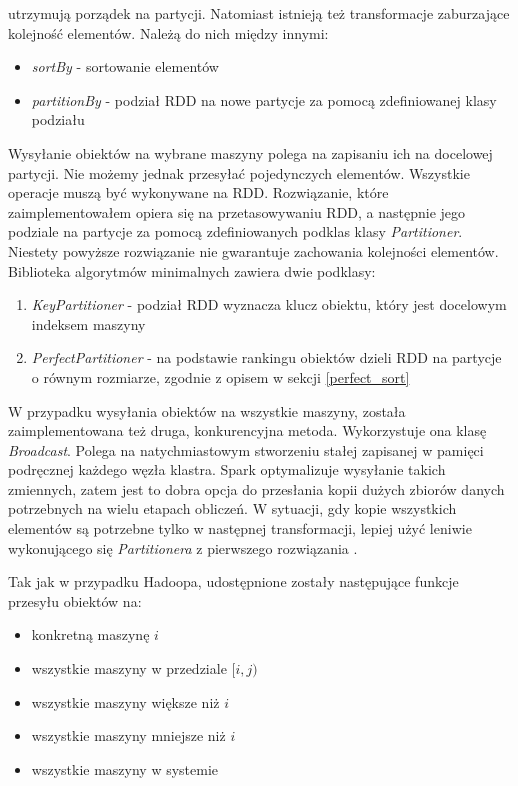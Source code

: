 \documentclass[licencjacka]{pracamgr}
\begin{document}
 utrzymują porządek na partycji. Natomiast istnieją też transformacje zaburzające kolejność elementów. Należą do nich między innymi:
 \begin{itemize}
     \item \textit{sortBy} - sortowanie elementów
     \item \textit{partitionBy} - podział RDD na nowe partycje za pomocą zdefiniowanej klasy podziału
 \end{itemize}

Wysyłanie obiektów na wybrane maszyny polega na zapisaniu ich na docelowej partycji. Nie możemy jednak przesyłać pojedynczych elementów. Wszystkie operacje muszą być wykonywane na RDD. Rozwiązanie, które zaimplementowałem opiera się na przetasowywaniu RDD, a następnie jego podziale na partycje za pomocą zdefiniowanych podklas klasy \textit{Partitioner}. Niestety powyższe rozwiązanie nie gwarantuje zachowania kolejności elementów. Biblioteka algorytmów minimalnych zawiera dwie podklasy:
\begin{enumerate}
    \item \textit{KeyPartitioner} - podział RDD wyznacza klucz obiektu, który jest docelowym indeksem maszyny
    \item \textit{PerfectPartitioner} - na podstawie rankingu obiektów dzieli RDD na partycje o równym rozmiarze, zgodnie z opisem w sekcji \ref{perfect_sort}
\end{enumerate}

W przypadku wysyłania obiektów na wszystkie maszyny, została zaimplementowana też druga, konkurencyjna metoda. Wykorzystuje ona klasę \textit{Broadcast}. Polega na natychmiastowym stworzeniu stałej zapisanej w pamięci podręcznej każdego węzła klastra. Spark optymalizuje wysyłanie takich zmiennych, zatem jest to dobra opcja do przesłania kopii dużych zbiorów danych potrzebnych na wielu etapach obliczeń. W sytuacji, gdy kopie wszystkich elementów są potrzebne tylko w następnej transformacji, lepiej użyć leniwie wykonującego się \textit{Partitionera} z pierwszego rozwiązania \cite{spark_documentation}.

Tak jak w przypadku Hadoopa, udostępnione zostały następujące funkcje przesyłu obiektów na:
\begin{itemize}
    \item konkretną maszynę \(i\)
    \item wszystkie maszyny w przedziale \([i, j)\)
    \item wszystkie maszyny większe niż \(i\)
    \item wszystkie maszyny mniejsze niż \(i\)
    \item wszystkie maszyny w systemie
\end{itemize}
\end{document}
